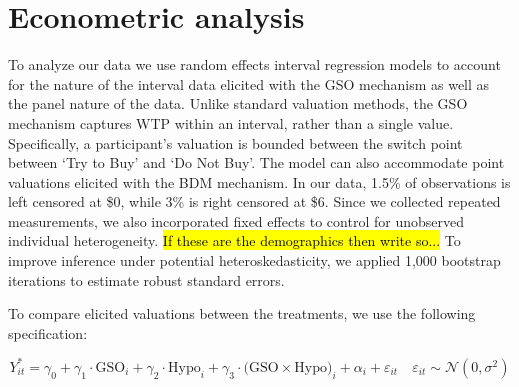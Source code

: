 \documentclass[12pt]{article}
\begin{document}


\section{Econometric analysis}
To analyze our data we use random effects interval regression models to account for the nature of the interval data elicited with the GSO mechanism as well as the panel nature of the data. Unlike standard valuation methods, the GSO mechanism captures WTP within an interval, rather than a single value. Specifically, a participant's valuation is bounded between the switch point between `Try to Buy' and `Do Not Buy'. The model can also accommodate point valuations elicited with the BDM mechanism. In our data, 1.5\% of observations is left censored at \$0, while 3\% is right censored at \$6. Since we collected repeated measurements, we also incorporated fixed effects to control for unobserved individual heterogeneity. \hl{If these are the demographics then write so...} To improve inference under potential heteroskedasticity, we applied 1,000 bootstrap iterations to estimate robust standard errors.

To compare elicited valuations between the treatments, we use the following specification:
\vspace{-1cm}

\begin{equation}\label{eq:specification}
Y_{it}^* = \gamma_0 + \gamma_1 \cdot \text{GSO}_i + \gamma_2 \cdot \text{Hypo}_i + \gamma_3 \cdot \text{(GSO} \times \text{Hypo)}_i + \alpha_i + \varepsilon_{it} 
\quad \varepsilon_{it} \sim \mathcal{N}(0, \sigma^2)
\end{equation}
\end{document}
